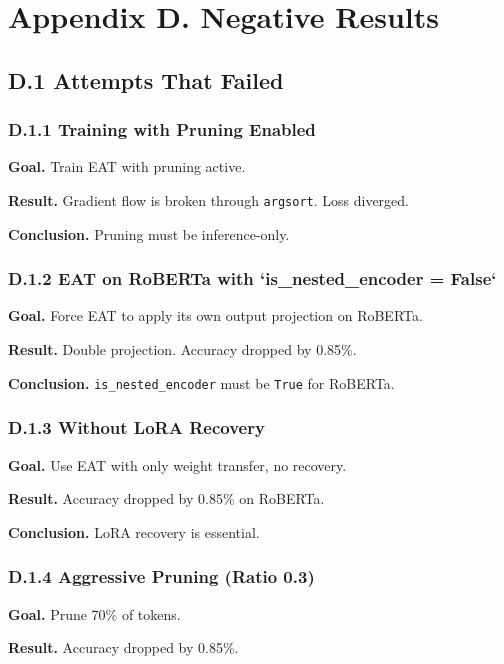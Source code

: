 
\section{Appendix D. Negative Results}

\subsection{D.1 Attempts That Failed}

\subsubsection{D.1.1 Training with Pruning Enabled}

\textbf{Goal.} Train EAT with pruning active.

\textbf{Result.} Gradient flow is broken through \texttt{argsort}. Loss diverged.

\textbf{Conclusion.} Pruning must be inference-only.

\subsubsection{D.1.2 EAT on RoBERTa with `is\_nested\_encoder = False`}

\textbf{Goal.} Force EAT to apply its own output projection on RoBERTa.

\textbf{Result.} Double projection. Accuracy dropped by 0.85\%.

\textbf{Conclusion.} \texttt{is\_nested\_encoder} must be \texttt{True} for RoBERTa.

\subsubsection{D.1.3 Without LoRA Recovery}

\textbf{Goal.} Use EAT with only weight transfer, no recovery.

\textbf{Result.} Accuracy dropped by 0.85\% on RoBERTa.

\textbf{Conclusion.} LoRA recovery is essential.

\subsubsection{D.1.4 Aggressive Pruning (Ratio 0.3)}

\textbf{Goal.} Prune 70\% of tokens.

\textbf{Result.} Accuracy dropped by 0.85\%.

